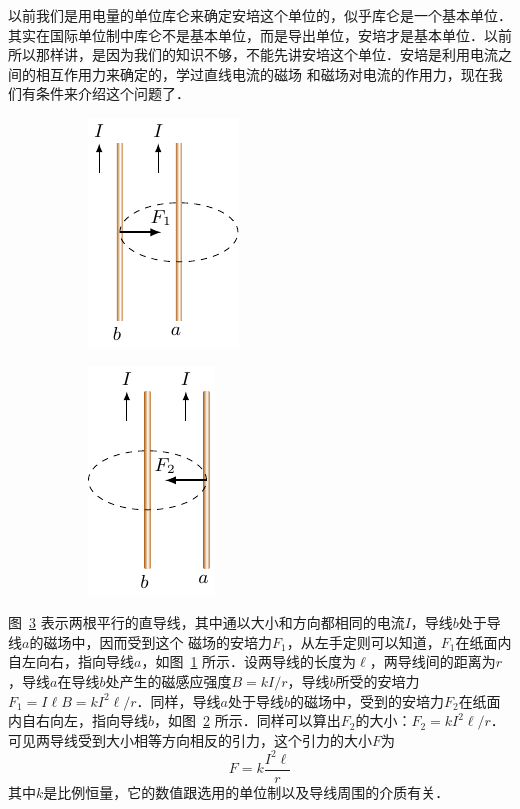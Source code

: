 以前我们是用电量的单位库仑来确定安培这个单位的，似乎库仑是一个基本单位．其实在国际单位制中库仑不是基本单位，而是导出单位，安培才是基本单位．以前所以那样讲，是因为我们的知识不够，不能先讲安培这个单位．安培是利用电流之间的相互作用力来确定的，学过直线电流的磁场
和磁场对电流的作用力，现在我们有条件来介绍这个问题了．
\begin{figure}[htbp]
    \centering
    \begin{subfigure}{0.4\linewidth}
        \centering
        \includegraphics{fig/C/1-23a.pdf}
        \caption{}\label{fig_C_1-23a}
    \end{subfigure}
    \hfil
    \begin{subfigure}{0.4\linewidth}
        \centering
        \includegraphics{fig/C/1-23b.pdf}
        \caption{}\label{fig_C_1-23b}
    \end{subfigure}
    \caption{}\label{fig_C_1-23}
\end{figure}

图~\ref{fig_C_1-23} 表示两根平行的直导线，其中通以大小和方向都相同的电流$I$，导线$b$处于导线$a$的磁场中，因而受到这个
磁场的安培力$F_1$，从左手定则可以知道，$F_1$在纸面内自左向右，指向导线$a$，如图~\ref{fig_C_1-23a} 所示．设两导线的长度为$\ell$，两导线间的距离为$r$，导线$a$在导线$b$处产生的磁感应强度$B=kI/r$，导线$b$所受的安培力$F_1=I\ell B=kI^2\ell/r$．同样，导线$a$处于导线$b$的磁场中，受到的安培力$F_2$在纸面内自右向左，指向导线$b$，如图~\ref{fig_C_1-23b} 所示．同样可以算出$F_2$的大小：$F_2=kI^2\ell/r$．可见两导线受到大小相等方向相反的引力，这个引力的大小$F$为
\[F=k\frac{I^2\ell}{r}\]
其中$k$是比例恒量，它的数值跟选用的单位制以及导线周围的介质有关．

